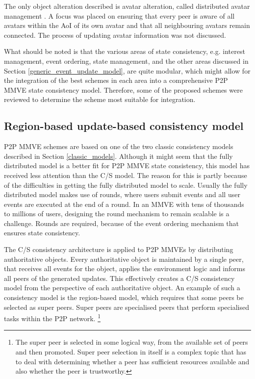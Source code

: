 The only object alteration described is avatar alteration, called distributed avatar management \cite{Varvello_dist_avatar_management}. A focus was placed on ensuring that every peer is aware of all avatars within the AoI of its own avatar and that all neighbouring avatars remain connected. The process of updating avatar information was not discussed.

What should be noted is that the various areas of state consistency, e.g. interest management, event ordering, state management, and the other areas discussed in Section \ref{generic_event_update_model}, are quite modular, which might allow for the integration of the best schemes in each area into a comprehensive P2P MMVE state consistency model. Therefore, some of the proposed schemes were reviewed to determine the scheme most suitable for integration.

\subsection{Region-based update-based consistency model}
P2P MMVE schemes are based on one of the two classic consistency models described in Section \ref{classic_models}. Although it might seem that the fully distributed model is a better fit for P2P MMVE state consistency, this model has received less attention than the C/S model. The reason for this is partly because of the difficulties in getting the fully distributed model to scale. Usually the fully distributed model makes use of rounds, where users submit events and all user events are executed at the end of a round. In an MMVE with tens of thousands to millions of users, designing the round mechanism to remain scalable is a challenge. Rounds are required, because of the event ordering mechanism that ensures state consistency.

The C/S consistency architecture is applied to P2P MMVEs by distributing authoritative objects. Every authoritative object is maintained by a single peer, that receives all events for the object, applies the environment logic and informs all peers of the generated updates. This effectively creates a C/S consistency model from the perspective of each authoritative object. An example of such a consistency model is the region-based model, which requires that some peers be selected as super peers. Super peers are specialised peers that perform specialised tasks within the P2P network. \footnote{The super peer is selected in some logical way, from the available set of peers and then promoted. Super peer selection in itself is a complex topic that has to deal with determining whether a peer has sufficient resources available and also whether the peer is trustworthy.}

